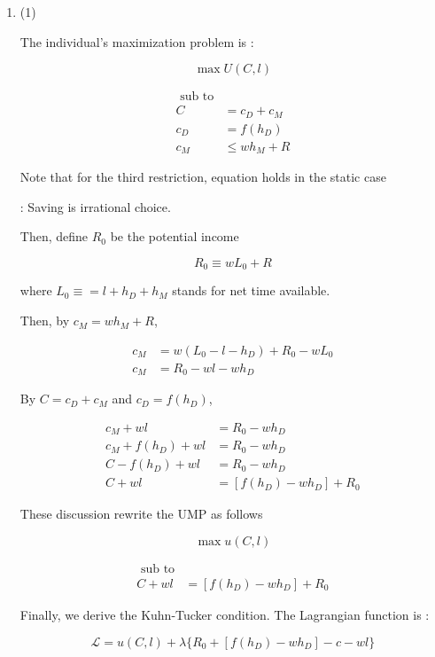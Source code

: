 \documentclass[dvipdfmx]{jsarticle}
\begin{document}
\begin{enumerate}
\begin{center}
 \end{center}
 
 \item
 
 (1)
 
 The individual's maximization problem is :
 
 \[ \max U(C,l) \]
 
  \begin{align*}
  \text{ sub to} \\
  C &= c_D + c_M \\
  c_D &= f(h_D) \\
  c_M & \leq w h_M + R
  \end{align*}
 
 Note that for the third restriction, equation holds in the static case
 
 : Saving is irrational choice.
 
 Then, define $R_0$ be the potential income
 
 \[R_0 \equiv w L_0 + R \]
 
 where $L_0 \equiv = l + h_D + h_M$ stands for net time available.
 
 Then, by $c_M = w h_M + R$, 
 
  \begin{align*}
  c_M &= w (L_0 - l - h_D) + R_0 - w L_0 \\
  c_M &= R_0 - wl - wh_D
  \end{align*}
 
 By $C = c_D + c_M$ and $c_D = f(h_D)$,
 
  \begin{align*}
  c_M + wl &= R_0 - w h_D \\
  c_M + f(h_D) + wl &= R_0 - w h_D \\
  C - f(h_D) + wl &= R_0 - w h_D \\
  C + wl &= [f(h_D) - w h_D] + R_0
  \end{align*}
 
 These discussion rewrite the UMP as follows
 
 \[\max u (C, l)\]
 
  \begin{align*}
  \text{ sub to} \\
  C + wl &= [f(h_D) - w h_D] + R_0
  \end{align*}
 
 Finally, we derive the Kuhn-Tucker condition. The Lagrangian function is :
 
 \[ \mathcal{L} = u(C,l) + \lambda \{ R_0 + [f(h_D) - w h_D] - c -wl \} \]
 

\end{enumerate}
\end{document}
